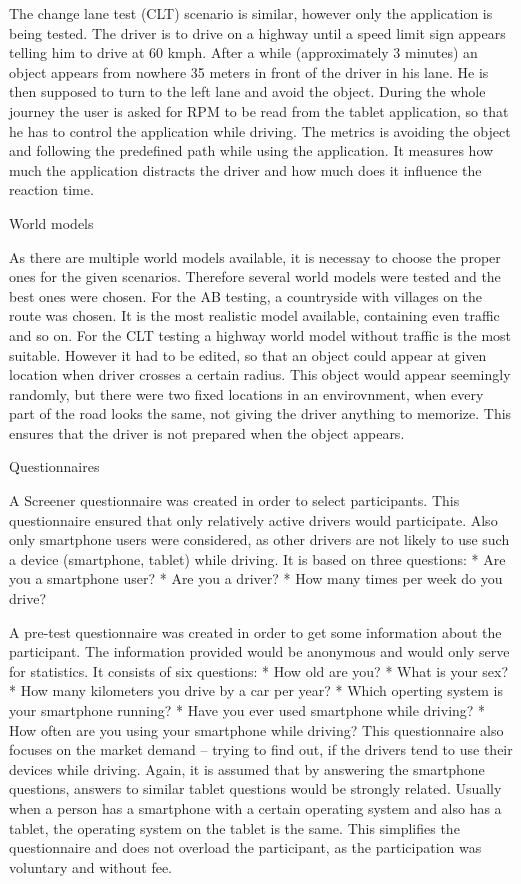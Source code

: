 The change lane test (CLT) scenario is similar, however only the  application is being tested. The driver is to drive on a highway until a speed limit sign appears telling him to drive at 60 kmph. After a while (approximately 3 minutes) an object appears from nowhere 35 meters in front of the driver in his lane. He is then supposed to turn to the left lane and avoid the object. During the whole journey the user is asked for RPM to be read from the tablet application, so that he has to control the application while driving. The metrics is avoiding the object and following the predefined path while using the application. It measures how much the application distracts the driver and how much does it influence the reaction time.  

\seccc World models

As there are multiple world models available, it is necessay to choose the proper ones for the given scenarios. Therefore several world models were tested and the best ones were chosen. For the AB testing, a countryside with villages on the route was chosen. It is the most realistic model available, containing even traffic and so on. For the CLT testing a highway world model without traffic is the most suitable. However it had to be edited, so that an object could appear at given location when driver crosses a certain radius. This object would appear seemingly randomly, but there were two fixed locations in an envirovnment, when every part of the road looks the same, not giving the driver anything to memorize. This ensures that the driver is not prepared when the object appears.

\seccc Questionnaires

A Screener questionnaire was created in order to select participants. This questionnaire ensured that only relatively active drivers would participate. Also only smartphone users were considered, as other drivers are not likely to use such a device (smartphone, tablet) while driving. It is based on three questions:
\begitems
* Are you a smartphone user?
* Are you a driver?
* How many times per week do you drive?
\enditems


A pre-test questionnaire was created in order to get some information about the participant. The information provided would be anonymous and would only serve for statistics. It consists of six questions:
\begitems
* How old are you?
* What is your sex?
* How many kilometers you drive by a car per year?
* Which operting system is your smartphone running?
* Have you ever used smartphone while driving?
* How often are you using your smartphone while driving?
\enditems
This questionnaire also focuses on the market demand -- trying to find out, if the drivers tend to use their devices while driving. Again, it is assumed that by answering the smartphone questions, answers to similar tablet questions would be strongly related. Usually when a person has a smartphone with a certain operating system and also has a tablet, the operating system on the tablet is the same. This simplifies the questionnaire and does not overload the participant, as the participation was voluntary and without fee.

